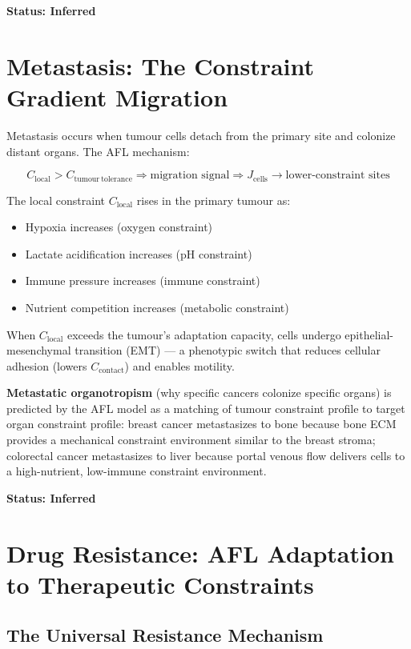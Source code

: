 \documentclass[12pt,a4paper]{article}
\begin{document}
\textbf{Status: Inferred}

\section{Metastasis: The Constraint Gradient Migration}

Metastasis occurs when tumour cells detach from the primary site and colonize distant organs. The AFL mechanism:

\begin{equation}
    C_{\mathrm{local}} > C_{\mathrm{tumour\ tolerance}} \Rightarrow \text{migration signal} \Rightarrow J_{\mathrm{cells}} \to \text{lower-constraint sites}
\end{equation}

The local constraint $C_{\mathrm{local}}$ rises in the primary tumour as:
\begin{itemize}
    \item Hypoxia increases (oxygen constraint)
    \item Lactate acidification increases (pH constraint)
    \item Immune pressure increases (immune constraint)
    \item Nutrient competition increases (metabolic constraint)
\end{itemize}

When $C_{\mathrm{local}}$ exceeds the tumour's adaptation capacity, cells undergo epithelial-mesenchymal transition (EMT) --- a phenotypic switch that reduces cellular adhesion (lowers $C_{\mathrm{contact}}$) and enables motility.

\textbf{Metastatic organotropism} (why specific cancers colonize specific organs) is predicted by the AFL model as a matching of tumour constraint profile to target organ constraint profile: breast cancer metastasizes to bone because bone ECM provides a mechanical constraint environment similar to the breast stroma; colorectal cancer metastasizes to liver because portal venous flow delivers cells to a high-nutrient, low-immune constraint environment.

\textbf{Status: Inferred}

\section{Drug Resistance: AFL Adaptation to Therapeutic Constraints}

\subsection{The Universal Resistance Mechanism}
\end{document}
